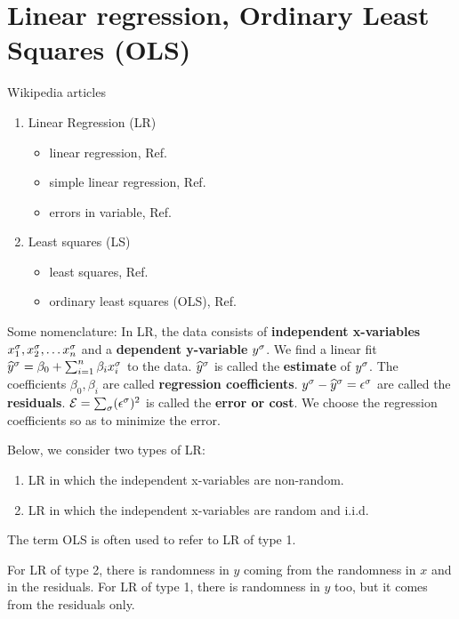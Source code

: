 \section{Linear regression, Ordinary Least Squares (OLS)}
\label{sec0-conv-lr}
Wikipedia articles
\begin{enumerate}
\item
Linear Regression (LR)
\begin{itemize}
\item
linear regression, Ref.\cite{wiki-lr}
\item
 simple linear regression, Ref.\cite{wiki-slr}
\item
errors in variable, Ref.\cite{wiki-errors-in-iv}

\end{itemize}
\item
Least squares (LS)
\begin{itemize}
\item
least squares, Ref.\cite{wiki-lsquares}
\item
ordinary least squares (OLS), Ref.\cite{wiki-ols}
\end{itemize}
\end{enumerate}


Some nomenclature: In LR, the
data consists of
{\bf independent x-variables} $x^\sigma_1,
 x^\sigma_2, \ldots x^\sigma_n$
and a {\bf dependent y-variable} $y^\sigma$.
We find a linear fit ${\widehat{y}}^\sigma =
\beta_0 + \sum_{i=1}^n \beta_i x^\sigma_i$
to the data.
${\widehat{y}}^\sigma$ is called the {\bf estimate}
of $y^\sigma$.
 The coefficients $\beta_0, \beta_i$
are called {\bf regression coefficients}.
$y^\sigma-{\widehat{y}}^\sigma=\epsilon^\sigma$
are called  the {\bf residuals}.
${\cal E} =\sum_\sigma (\epsilon^\sigma)^2$
is called the {\bf error or cost}. We choose the
regression coefficients
so as to minimize the error.

Below, we consider two types of LR:

\begin{enumerate}
\item
LR
in which the independent x-variables are non-random.
\item
LR
in which the independent x-variables are random
and i.i.d.
\end{enumerate}

The  term OLS
is often used to refer to LR
of type 1.



For LR of type 2,
there is randomness in $y$
coming from the randomness in $x$
and in the residuals.
For LR of type 1,
there  is randomness in $y$
too, but
it comes
from the residuals
only.

